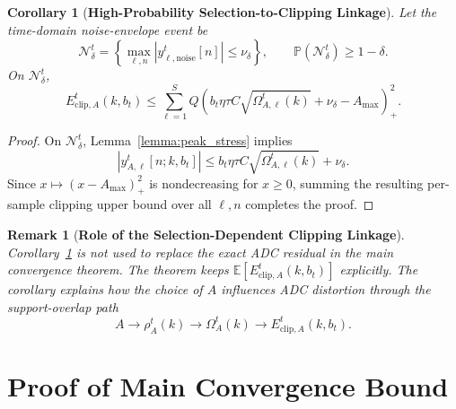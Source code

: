 \documentclass[conference]{IEEEtran}
\newtheorem{corollary}{Corollary}
\newtheorem{remark}{Remark}
\begin{document}
\begin{corollary}[\bf High-Probability Selection-to-Clipping Linkage]
    \label{cor:clipping_linkage}
    Let the time-domain noise-envelope event be
    \begin{equation}
        \mathcal{N}_{\delta}^{t}
        =\left\{\max_{\ell,n}|y_{\ell,\mathrm{noise}}^t[n]|\le\nu_\delta\right\},
        \qquad
        \mathbb{P}(\mathcal{N}_{\delta}^{t})\ge 1-\delta.
    \end{equation}
    On $\mathcal{N}_{\delta}^{t}$,
    \begin{equation}
        E_{\mathrm{clip},A}^{t}(k,b_t)
        \le
        \sum_{\ell=1}^{S}Q
        \left(
        b_t\eta\tau C\sqrt{\Omega_{A,\ell}^{t}(k)}+
        \nu_\delta-A_{\max}
        \right)_+^2.
    \end{equation}
\end{corollary}
\begin{proof}
    On $\mathcal{N}_{\delta}^{t}$, Lemma~\ref{lemma:peak_stress} implies
    \begin{equation}
        |y_{A,\ell}^t[n;k,b_t]|
        \le
        b_t\eta\tau C\sqrt{\Omega_{A,\ell}^{t}(k)}+\nu_\delta.
    \end{equation}
    Since $x\mapsto(x-A_{\max})_+^2$ is nondecreasing for $x\ge0$, summing the resulting per-sample clipping upper bound over all $\ell,n$ completes the proof.
\end{proof}

\begin{remark}[\bf Role of the Selection-Dependent Clipping Linkage]
    Corollary~\ref{cor:clipping_linkage} is not used to replace the exact ADC residual in the main convergence theorem. The theorem keeps $\mathbb{E}[E_{\mathrm{clip},A}^{t}(k,b_t)]$ explicitly. The corollary explains how the choice of $A$ influences ADC distortion through the support-overlap path
    \begin{equation}
        A\rightarrow \rho_A^t(k)\rightarrow\Omega_A^t(k)\rightarrow E_{\mathrm{clip},A}^{t}(k,b_t).
    \end{equation}
\end{remark}

\section{Proof of Main Convergence Bound}
\end{document}

